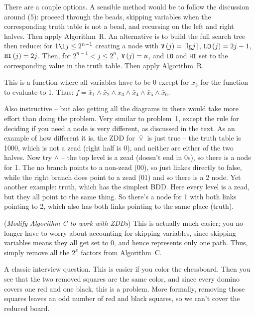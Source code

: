 \vskip 0.08in  There are a couple options.  A sensible method
would be to follow the discussion around (5): proceed through the beads,
skipping variables when the corresponding truth table is not a bead,
and recursing on the left and right halves.  Then apply Algorithm~R.
An alternative is to build the full search tree then reduce: for $1 \l j \le 2^{n-1}$
creating a node with ${\tt V}\left(j\right) = \lceil {\rm lg} j \rceil$,
${\tt LO}\left(j\right) = 2 j - 1$, ${\tt HI}\left(j\right) = 2 j$.  Then, for
$2^{n-1} < j \le 2^n$, ${\tt V}\left(j\right) = n$, and {\tt LO} and {\tt HI}
set to the corresponding value in the truth table.  Then apply Algorithm~R.

\vskip 0.08in  This is a function where all variables have to be
0 except for $x_3$ for the function to evaluate to 1.  Thus: 
$f = \bar x_1 \land \bar x_2 \land x_3 \land \bar x_4 \land \bar x_5 \land \bar x_6$.

\vskip 0.08in  Also instructive -- but also getting
all the diagrams in there would take more effort than doing the problem.
Very similar to problem~1, except the rule for deciding if you need a node
is very different, as discussed in the text.  As an example of how
different it is, the ZDD for $\bar \vee$ is just true -- the truth table is 1000, which
is not a zead (right half is 0), and neither are either of the two halves.
Now try $\land$ -- the top level is a zead (doesn't end in 0s), so there is a node
for 1.  The no branch points to a non-zead (00), so just linkes directly to false,
while the right branch does point to a zead (01) and so there is a 2 node.
Yet another example: truth, which has the simplest BDD.  Here every level is a zead,
but they all point to the same thing.  So there's a node for 1 with both links pointing
to 2, which also has both links pointing to the same place (truth).

\vskip 0.08in  ({\it Modify Algorithm C to work with ZDDs})
\hfil\break This is actually much easier; you no longer have to worry about accounting
for skipping variables, since skipping variables means they all get set to 0, and
hence represents only one path.  Thus, simply remove all the $2^x$ factors
from Algorithm~C.

\vskip 0.08in  A classic interview question.  This
is easier if you color the chessboard.  Then you see that the two removed
squares are the same color, and since every domino covers one red and
one black, this is a problem.  More formally, removing those squares
leaves an odd number of red and black squares, so we can't cover
the reduced board.

